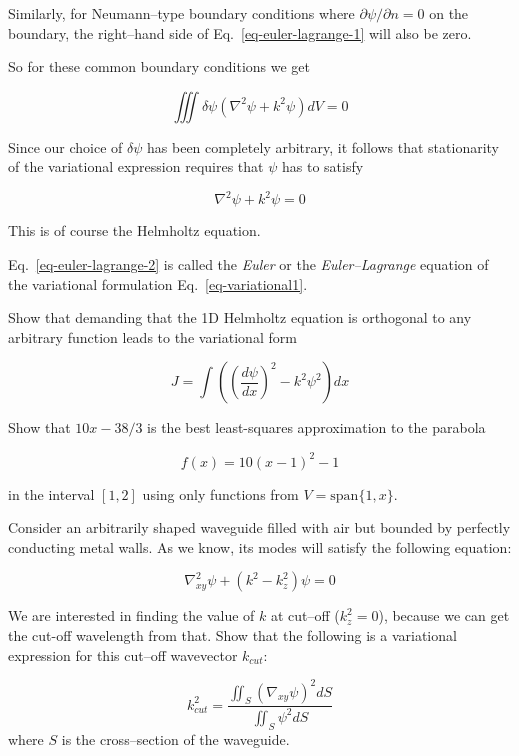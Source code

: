 Similarly, for Neumann--type boundary conditions where $\partial \psi / \partial n = 0$ on the boundary, the right--hand side of Eq.~\ref{eq-euler-lagrange-1} will also be zero.

So for these common boundary conditions we get

\begin{equation}
\iiint \delta \psi (\nabla^2 \psi + k^2 \psi ) dV = 0
\end{equation} 

Since our choice of $\delta \psi$ has been completely arbitrary, it follows that stationarity of the variational expression requires that $\psi$ has to satisfy

\begin{equation}
\nabla^2 \psi + k^2 \psi = 0 \label{eq-euler-lagrange-2}
\end{equation} 

This is of course the Helmholtz equation.

Eq.~\ref{eq-euler-lagrange-2} is called the \emph{Euler} or the \emph{Euler--Lagrange} equation of the variational formulation Eq.~\ref{eq-variational1}.

\begin{sidebar}
\begin{ex}
Show that demanding that the 1D Helmholtz equation is orthogonal to any arbitrary function leads to the variational form 

$$J = \int \left( \left(\frac{d \psi}{d x}\right)^2 - k^2 \psi^2 \right) dx$$

\end{ex}
\end{sidebar}


\begin{sidebar}
\begin{ex}
Show that $10x-38/3$ is the best least-squares approximation to the parabola 

$$f(x) = 10(x-1)^2 -1$$ 

in the interval $[1,2]$ using only functions from $V = \mathrm{span} \{1, x\}$.

\end{ex}
\end{sidebar}


\begin{sidebar}
\begin{ex}
Consider an arbitrarily shaped waveguide filled with air but bounded by perfectly conducting metal walls. As we know, its modes will satisfy the following equation:

$$ \nabla_{xy}^2 \psi + \left( k^2 - k_z^2 \right)\psi = 0 $$

We are interested in finding the value of $k$ at cut--off ($k_z^2=0$), because we can get the cut-off wavelength from that. Show that the following is a variational expression for this cut--off wavevector $k_{cut}$:

$$ k_{cut}^2 = \frac{\iint_S (\nabla_{xy} \psi)^2 dS}{\iint_S \psi^2 dS}$$
where $S$ is the cross--section of the waveguide.
\end{ex}
\end{sidebar}



